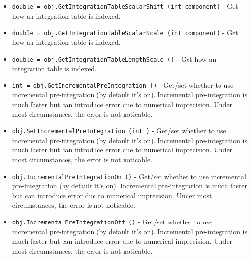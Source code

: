 \begin{itemize}
\item  \verb|double = obj.GetIntegrationTableScalarShift (int component)| -  Get how an integration table is indexed.

\item  \verb|double = obj.GetIntegrationTableScalarScale (int component)| -  Get how an integration table is indexed.

\item  \verb|double = obj.GetIntegrationTableLengthScale ()| -  Get how an integration table is indexed.

\item  \verb|int = obj.GetIncrementalPreIntegration ()| -  Get/set whether to use incremental pre-integration (by default it's
 on).  Incremental pre-integration is much faster but can introduce
 error due to numerical imprecision.  Under most circumstances, the
 error is not noticable.

\item  \verb|obj.SetIncrementalPreIntegration (int )| -  Get/set whether to use incremental pre-integration (by default it's
 on).  Incremental pre-integration is much faster but can introduce
 error due to numerical imprecision.  Under most circumstances, the
 error is not noticable.

\item  \verb|obj.IncrementalPreIntegrationOn ()| -  Get/set whether to use incremental pre-integration (by default it's
 on).  Incremental pre-integration is much faster but can introduce
 error due to numerical imprecision.  Under most circumstances, the
 error is not noticable.

\item  \verb|obj.IncrementalPreIntegrationOff ()| -  Get/set whether to use incremental pre-integration (by default it's
 on).  Incremental pre-integration is much faster but can introduce
 error due to numerical imprecision.  Under most circumstances, the
 error is not noticable.

\end{itemize}
